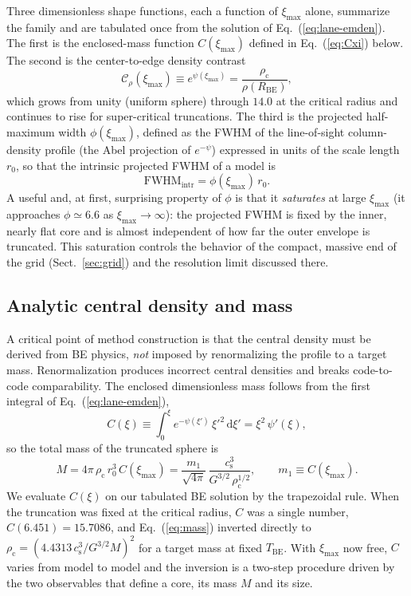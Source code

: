 \documentclass[11pt,a4paper]{article}
\newcommand{\rhoc}{\rho_{\mathrm{c}}}
\newcommand{\cs}{c_{\mathrm{s}}}
\newcommand{\rzero}{r_{0}}
\newcommand{\Rbe}{R_{\mathrm{BE}}}
\newcommand{\Tbe}{T_{\mathrm{BE}}}
\newcommand{\ximax}{\xi_{\mathrm{max}}}
\begin{document}
Three dimensionless shape functions, each a function of $\ximax$ alone,
summarize the family and are tabulated once from the solution of
Eq.~(\ref{eq:lane-emden}). The first is the enclosed-mass function $C(\ximax)$
defined in Eq.~(\ref{eq:Cxi}) below. The second is the center-to-edge density
contrast
\begin{equation}
  \mathcal{C}_{\rho}(\ximax) \equiv e^{\psi(\ximax)}
  = \frac{\rhoc}{\rho(\Rbe)} ,
  \label{eq:contrast}
\end{equation}
which grows from unity (uniform sphere) through $14.0$ at the critical radius
and continues to rise for super-critical truncations. The third is the
projected half-maximum width $\phi(\ximax)$, defined as the FWHM of the
line-of-sight column-density profile (the Abel projection of $e^{-\psi}$)
expressed in units of the scale length $\rzero$, so that the intrinsic
projected FWHM of a model is
\begin{equation}
  \mathrm{FWHM}_{\mathrm{intr}} = \phi(\ximax)\,\rzero .
  \label{eq:phidef}
\end{equation}
A useful and, at first, surprising property of $\phi$ is that it \emph{saturates}
at large $\ximax$ (it approaches $\phi \simeq 6.6$ as $\ximax \to \infty$): the
projected FWHM is fixed by the inner, nearly flat core and is almost
independent of how far the outer envelope is truncated. This saturation
controls the behavior of the compact, massive end of the grid
(Sect.~\ref{sec:grid}) and the resolution limit discussed there.

\subsection{Analytic central density and mass}
\label{sec:inversion}

A critical point of method construction is that the central density must be
derived from BE physics, \emph{not} imposed by renormalizing the profile to
a target mass. Renormalization produces incorrect central densities and
breaks code-to-code comparability. The enclosed dimensionless mass follows
from the first integral of Eq.~(\ref{eq:lane-emden}),
\begin{equation}
  C(\xi)\equiv\int_{0}^{\xi} e^{-\psi(\xi')}\,\xi'^{2}\,\mathrm{d}\xi'
  = \xi^{2}\,\psi'(\xi),
  \label{eq:Cxi}
\end{equation}
so the total mass of the truncated sphere is
\begin{equation}
  M = 4\pi\,\rhoc\,\rzero^{3}\,C(\ximax)
    = \frac{m_{1}}{\sqrt{4\pi}}\,
      \frac{\cs^{3}}{G^{3/2}\,\rhoc^{1/2}},
  \qquad
  m_{1}\equiv C(\ximax).
  \label{eq:mass}
\end{equation}
We evaluate $C(\xi)$ on our tabulated BE solution by the trapezoidal rule.
When the truncation was fixed at the critical radius, $C$ was a single number,
$C(6.451)=15.7086$, and Eq.~(\ref{eq:mass}) inverted directly to
$\rhoc=(4.4313\,\cs^{3}/G^{3/2}M)^{2}$ for a target mass at fixed $\Tbe$. With
$\ximax$ now free, $C$ varies from model to model and the inversion is a
two-step procedure driven by the two observables that define a core, its mass
$M$ and its size.
\end{document}
